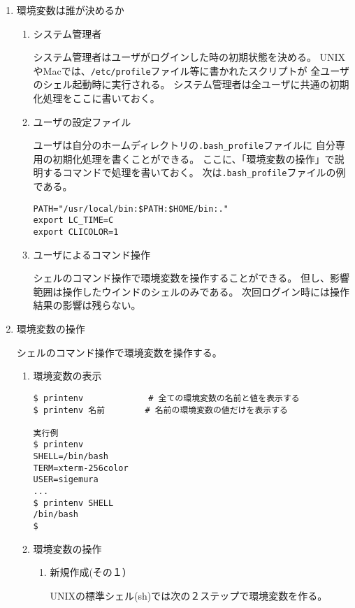 \documentclass[a4j,dvipdfmx]{jarticle}
\begin{document}
\begin{enumerate}
\item 環境変数は誰が決めるか

\begin{enumerate}
\item システム管理者

システム管理者はユーザがログインした時の初期状態を決める。
UNIXやMacでは、\verb;/etc/profile;ファイル等に書かれたスクリプトが
全ユーザのシェル起動時に実行される。
システム管理者は全ユーザに共通の初期化処理をここに書いておく。

\item ユーザの設定ファイル

ユーザは自分のホームディレクトリの\verb;.bash_profile;ファイルに
自分専用の初期化処理を書くことができる。
ここに、「環境変数の操作」で説明するコマンドで処理を書いておく。
次は\verb;.bash_profile;ファイルの例である。

\begin{lstlisting}[numbers=none]
PATH="/usr/local/bin:$PATH:$HOME/bin:."
export LC_TIME=C
export CLICOLOR=1
\end{lstlisting}

\item ユーザによるコマンド操作

シェルのコマンド操作で環境変数を操作することができる。
但し、影響範囲は操作したウインドのシェルのみである。
次回ログイン時には操作結果の影響は残らない。

\end{enumerate}

\item 環境変数の操作

シェルのコマンド操作で環境変数を操作する。
\begin{enumerate}
\item 環境変数の表示

\begin{lstlisting}[numbers=none]
$ printenv             # 全ての環境変数の名前と値を表示する
$ printenv 名前        # 名前の環境変数の値だけを表示する

実行例
$ printenv
SHELL=/bin/bash
TERM=xterm-256color
USER=sigemura
...
$ printenv SHELL
/bin/bash
$
\end{lstlisting}

\item 環境変数の操作

\begin{enumerate}
\item 新規作成(その１）

UNIXの標準シェル(sh)では次の２ステップで環境変数を作る。


\end{enumerate}
\end{enumerate}
\end{enumerate}
\end{document}
